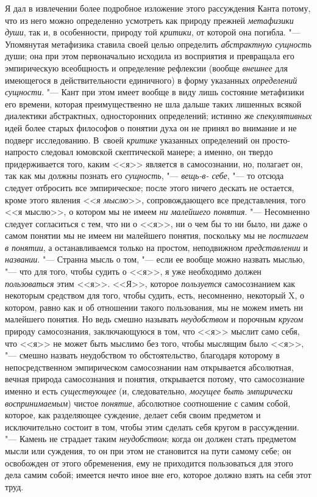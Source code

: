 {{Я дал в извлечении более подробное изложение этого рассуждения
Канта потому, что из него можно определенно усмотреть как природу прежней
{\em метафизики души},
так и, в особенности, природу той
{\em критики}, от которой
она погибла. "--- Упомянутая метафизика ставила своей целью
определить {\em абстрактную сущность}
души; она при этом первоначально исходила из восприятия и
превращала его эмпирическую всеобщность и определение рефлексии (вообще
{\em внешнее} для
имеющегося в действительности единичного) в форму указанных
{\em определений сущности}. "---
Кант при этом имеет вообще в виду лишь состояние метафизики
его времени, которая преимущественно не шла дальше таких лишенных всякой
диалектики абстрактных, односторонних определений; истинно же
{\em спекулятивных} идей
более старых философов о понятии духа он не принял во внимание и не подверг
исследованию. В~своей {\em критике}
указанных определений он просто-напросто следовал юмовской
скептической манере; а именно, он твердо придерживается того, каким <<я>>
является в самосознании, но, полагает он, так как мы должны познать его
{\em сущность}, "---
{\em вещь-в- себе}, "--- то
отсюда следует отбросить все эмпирическое; после этого ничего дескать не
остается, кроме этого явления
<<{\em я мыслю}>>,
сопровождающего все представления, того <<я мыслю>>, о котором
мы не имеем {\em ни малейшего понятия}.
"--- Несомненно следует согласиться с тем, что ни о <<я>>, ни о
чем бы то ни было, ни даже о самом понятии мы не имеем ни малейшего
понятия, поскольку мы не {\em постигаем
в понятии}, а останавливаемся только на простом, неподвижном
{\em представлении} и
{\em названии}. "--- Странна
мысль о том, "--- если ее вообще можно назвать мыслью, "---
что для того, чтобы судить о <<я>>, я уже необходимо должен
{\em пользоваться} этим
<<я>>. <<Я>>, которое {\em пользуется}
самосознанием как некоторым средством для того, чтобы судить,
есть, несомненно, некоторый X, о котором, равно как и об отношении такого
пользования, мы не можем иметь ни малейшего понятия. Но ведь смешно
называть {\em неудобством}
и порочным
{\em кругом}
природу самосознания, заключающуюся в том, что <<я>> мыслит
само себя, что <<я>> не может быть мыслимо без того, чтобы мыслящим было
<<я>>, "--- смешно назвать неудобством то обстоятельство,
благодаря которому в непосредственном эмпирическом
самосознании нам открывается абсолютная, вечная природа самосознания и
понятия, открывается потому, что самосознание именно и есть
{\em существующее} (и,
следовательно, {\em могущее быть
эмпирически воспринимаемым}) чистое
{\em понятие}, абсолютное
соотношение с самим собой, которое, как разделяющее суждение, делает себя
своим предметом и исключительно состоит в том, чтобы этим сделать себя
кругом в рассуждении. "--- Камень не страдает таким
{\em неудобством}; когда
он должен стать предметом мысли или суждения, то он при этом не становится
на пути самому себе; он освобожден от этого обременения, ему не приходится
пользоваться для этого дела самим собой; имеется нечто иное вне его,
которое должно взять на себя этот труд.

}}
